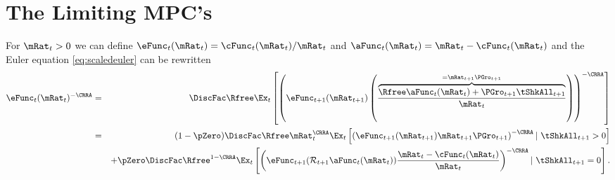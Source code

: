\documentclass[../BufferStockTheory.tex]{subfiles}
\begin{document}
\hypertarget{The-Limiting-MPCs}{}
\section{The Limiting MPC's}
\label{sec:MPCLimits}
For $\mRat_{t}>0$ we can define $\eFunc_{t}(\mRat_{t})=\cFunc_{t}(\mRat_{t})/\mRat_{t}$
and $\aFunc_{t}(\mRat_{t})=\mRat_{t}-\cFunc_{t}(\mRat_{t})$
and the Euler equation \eqref{eq:scaledeuler} can be rewritten
\begin{eqnarray}
 \eFunc_{t}(\mRat_{t})^{-\CRRA} & = & \DiscFac \Rfree \Ex_{t}\left[\left(\eFunc_{t+1}({\mRat}_{t+1})\left(\frac{\overbrace{\Rfree \aFunc_{t}(\mRat_{t})+{\PGro}_{t+1}{\tShkAll}_{t+1}}^{=\mRat_{t+1}\PGro_{t+1}}}{\mRat_{t}}\right)\right)^{-\CRRA }\right] \label{eq:eFuncEuler}
\\ & = & \phantom{ + }\pNotZero \DiscFac \Rfree \mRat_{t}^{\CRRA} \Ex_{t}\left[ \left(\eFunc_{t+1}(\mRat_{t+1}) \mRat_{t+1}\PGro_{t+1}\right)^{-\CRRA} |~ \tShkAll_{t+1}>0 \right] \notag
\\ &  & + \pZero  \DiscFac \Rfree^{1-\CRRA} \Ex_{t}\left[\left(\eFunc_{t+1}(\mathcal{R}_{t+1}\aFunc_{t}(\mRat_{t}))\frac{\mRat_t-\cFunc_{t}(\mRat_{t})}{\mRat_{t}}\right)^{-\CRRA} |~ \tShkAll_{t+1} = 0 \right]  \label{eq:eRho}.
\end{eqnarray}

\end{document}
